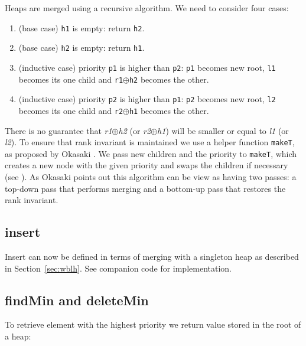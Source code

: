 Heaps are merged using a recursive algorithm. We need to consider four cases:

\begin{enumerate}
 \item (base case) \texttt{h1} is empty: return \texttt{h2}.
 \item (base case) \texttt{h2} is empty: return \texttt{h1}.
 \item (inductive case) priority \texttt{p1} is higher than \texttt{p2}: \texttt{p1} becomes new root, \texttt{l1} becomes its one child and \texttt{r1}$\oplus$\texttt{h2} becomes the other.
 \item (inductive case) priority \texttt{p2} is higher than \texttt{p1}: \texttt{p2} becomes new root, \texttt{l2} becomes its one child and \texttt{r2}$\oplus$\texttt{h1} becomes the other.
\end{enumerate}
\noindent
There is no guarantee that \textit{r1}$\oplus$\textit{h2} (or \textit{r2}$\oplus$\textit{h1}) will be smaller or equal to \textit{l1} (or \textit{l2}). To ensure that rank invariant is maintained we use a helper function \texttt{makeT}, as proposed by Okasaki \cite{Oka99}. We pass new children and the priority to \texttt{makeT}, which creates a new node with the given priority and swaps the children if necessary (see ). As Okasaki points out this algorithm can be view as having two passes: a top-down pass that performs merging and a bottom-up pass that restores the rank invariant.

\subsection{insert}

Insert can now be defined in terms of merging with a singleton heap as described in Section~\ref{sec:wblh}. See companion code for implementation.

\subsection{findMin and deleteMin}

To retrieve element with the highest priority we return value stored in the root of a heap:

